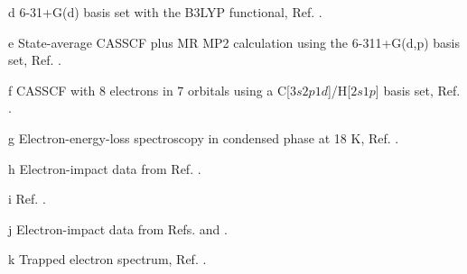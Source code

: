\begin{center}
\begin{threeparttable}
\begin{tablenotes}
\item[d] 6-31+G(d) basis set with the B3LYP functional, Ref. .
\item[e] State-average CASSCF plus MR MP2 calculation using the 6-311+G(d,p) basis set, 
Ref. .
\item[f] CASSCF with 8 electrons in 7 orbitals using a C[$3s2p1d$]/H[$2s1p$] basis set,
Ref. .
\item[g] Electron-energy-loss spectroscopy in condensed phase at 18 K, Ref.
.
\item[h] Electron-impact data from Ref. .
\item[i] Ref. .
\item[j] Electron-impact data from Refs.  and .
\item[k] Trapped electron spectrum, Ref. .
\end{tablenotes}
\end{threeparttable}
\end{center}
